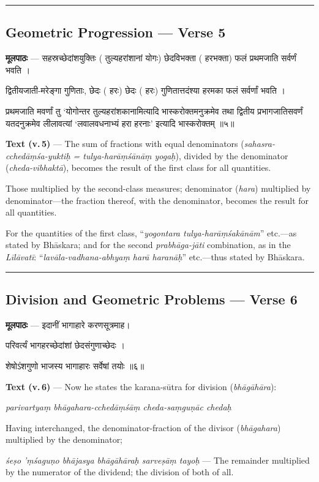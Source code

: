 \documentclass[11pt,a4paper]{article}
\newcommand{\skt}[1]{{\devanagarifont\color{sktcolor} #1}}
\newenvironment{bilingual}{%
  \par\noindent
  \begin{minipage}[t]{0.47\textwidth}%
}{%
  \par\end{minipage}%
}
\newcommand{\rightcol}{%
  \par\end{minipage}%
  \hfill
  \begin{minipage}[t]{0.47\textwidth}%
}
\begin{document}
\medskip
\noindent\rule{\textwidth}{0.4pt}

\subsection*{Geometric Progression --- Verse 5}

\begin{bilingual}
\textbf{मूलपाठः} --- \skt{सहस्रच्छेदांशयुक्तिः} (\skt{तुल्यहरांशानां योगः}) \skt{छेदविभक्ता} (\skt{हरभक्ता}) \skt{फलं प्रथमजाति सर्वर्णं भवति} ।

\skt{द्वितीयजाती-मरेङ्गा गुणिताः, छेदः} (\skt{हरः}) \skt{छेदः} (\skt{हरः}) \skt{गुणितात्तदंश्या हरमका फलं सर्वर्णां भवति} ।

\skt{प्रथमजाति मवर्णां तु `योगोन्तर तुल्यहरांशकानामित्यादि भास्करोक्तमनुक्रमेव तथा द्वितीय प्रभागजातिसवर्णं यतदनुक्रमेव लीलावत्यां `लवालवधनाभ्यं हरा हरनाः' इत्यादि भास्करोक्तम्} ॥५॥
\rightcol
\textbf{Text (v.\,5)} --- The sum of fractions with equal denominators (\textit{sahasra-cchedāṃśa-yuktiḥ = tulya-harāṃśānāṃ yogaḥ}), divided by the denominator (\textit{cheda-vibhaktā}), becomes the result of the first class for all quantities.

Those multiplied by the second-class measures; denominator (\textit{hara}) multiplied by denominator---the fraction thereof, with the denominator, becomes the result for all quantities.

For the quantities of the first class, ``\textit{yogontara tulya-harāṃśakānām}'' etc.---as stated by Bhāskara; and for the second \textit{prabhāga-jāti} combination, as in the \textit{Līlāvatī}: ``\textit{lavāla-vadhana-abhyaṃ harā haranāḥ}'' etc.---thus stated by Bhāskara.
\end{bilingual}

\medskip
\noindent\rule{\textwidth}{0.4pt}

\subsection*{Division and Geometric Problems --- Verse 6}

\begin{bilingual}
\textbf{मूलपाठः} --- \skt{इदानीं भागाहारे करणसूत्रमाह}।

\skt{परिवर्त्यं भागहरच्छेदांशां छेदसंगुणाच्छेदः} ।

\skt{शेषोऽंशगुणो भाजस्य भागाहारः सर्वेषां तयोः} ॥६॥
\rightcol
\textbf{Text (v.\,6)} --- Now he states the karana-sūtra for division (\textit{bhāgāhāra}):

\textit{parivartyaṃ bhāgahara-cchedāṃśāṃ cheda-saṃguṇāc chedaḥ}

Having interchanged, the denominator-fraction of the divisor (\textit{bhāgahara}) multiplied by the denominator;

\textit{śeṣo 'ṃśaguṇo bhājasya bhāgāhāraḥ sarveṣāṃ tayoḥ} --- The remainder multiplied by the numerator of the dividend; the division of both of all.
\end{bilingual}
\end{document}
